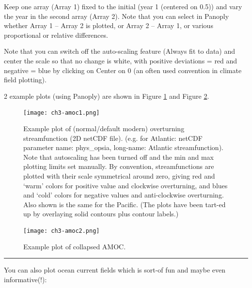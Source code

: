 \documentclass[11pt,fleqn]{book} %
\begin{document}
Keep one array (Array 1) fixed to the initial (year 1 (centered on 0.5)) and vary the year in the second array (Array 2). Note that you can select in Panoply whether Array 1 – Array 2 is plotted, or Array 2 – Array 1, or various proportional or relative differences.

Note that you can switch off the auto-scaling feature (Always fit to data) and center the scale so that no change is white, with positive deviations = red and negative = blue by clicking on Center on 0 (an often used convention in climate field plotting).

2 example plots (using Panoply) are shown in Figure \ref{fig:ch3-amoc1} and Figure \ref{fig:ch3-amoc2}. 

\begin{figure}
\texttt{[image: ch3-amoc1.png]}\centering
\vspace{-0mm}
\caption{Example plot of (normal/default modern) overturning streamfunction (2D netCDF file). (e.g. for Atlantic: netCDF parameter name: phys\_opsia, long-name: Atlantic streamfunction). Note that autoscaling has been turned off and the min and max plotting limits set manually. By convention, streamfunctions are plotted with their scale symmetrical around zero, giving red and ‘warm’ colors for positive value and clockwise overturning, and blues and ‘cold’ colors for negative values and anti-clockwise overturning. Also shown is the same for the Pacific. (The plots have been tart-ed up by overlaying solid contours plus contour labels.)}
\label{fig:ch3-amoc1}
\end{figure}

\begin{figure}
\texttt{[image: ch3-amoc2.png]}\centering
\vspace{-0mm}
\caption{Example plot of collapsed AMOC.}
\label{fig:ch3-amoc2}
\end{figure}

\hfill \break
\noindent\rule{4cm}{0.1mm}
\hfill \break

You can also plot ocean current fields which is sort-of fun and maybe even informative(!):
\end{document}
